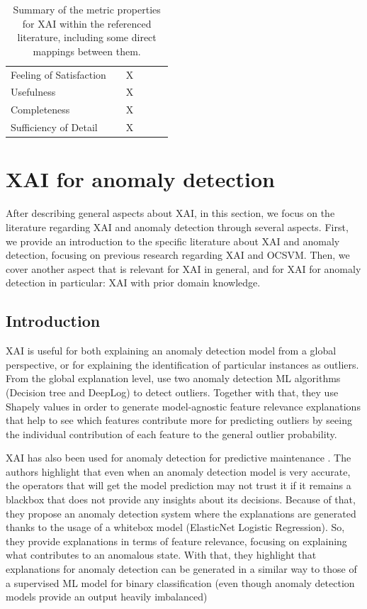 \begin{table}[h!]
{\begin{tabular}{@{}llllll@{}}
\multicolumn{1}{l|}{Feeling of Satisfaction}         &   & X &   &   &   \\
\multicolumn{1}{l|}{Usefulness}                      &   & X &   &   &   \\
\multicolumn{1}{l|}{Completeness}                    &   & X &   &   &   \\
\multicolumn{1}{l|}{Sufficiency of Detail}           &   & X &   &   &   \\ \bottomrule
\end{tabular}%
}
\caption{Summary of the metric properties for XAI within the referenced literature, including some direct mappings between them.}
\label{table:ch2-sota-taxonomy-sota}
\end{table}


\section{XAI for anomaly detection}\label{sec:ch2-sota-xai-anomaly-detection}
After describing general aspects about XAI, in this section, we focus on the literature regarding XAI and anomaly detection through several aspects. First, we provide an introduction to the specific literature about XAI and anomaly detection, focusing on previous research regarding XAI and OCSVM. Then, we cover another aspect that is relevant for XAI in general, and for XAI for anomaly detection in particular: XAI with prior domain knowledge. 

\subsection{Introduction}\label{subsec:ch2-sota-xai-anomaly-detection-intro}
XAI is useful for both explaining an anomaly detection model from a global perspective, or for explaining the identification of particular instances as outliers. From the global explanation level, \parencite{tallon2020explainable} use two anomaly detection ML algorithms (Decision tree and DeepLog) to detect outliers. Together with that, they use Shapely values in order to generate model-agnostic feature relevance explanations that help to see which features contribute more for predicting outliers by seeing the individual contribution of each feature to the general outlier probability. 

XAI has also been used for anomaly detection for predictive maintenance \parencite{langone2020interpretable}. The authors highlight that even when an anomaly detection model is very accurate, the operators that will get the model prediction may not trust it if it remains a blackbox that does not provide any insights about its decisions. Because of that, they propose an anomaly detection system where the explanations are generated thanks to the usage of a whitebox model (ElasticNet Logistic Regression). So, they provide explanations in terms of feature relevance, focusing on explaining what contributes to an anomalous state. With that, they highlight that explanations for anomaly detection can be generated in a similar way to those of a supervised ML model for binary classification (even though anomaly detection models provide an output heavily imbalanced) 

